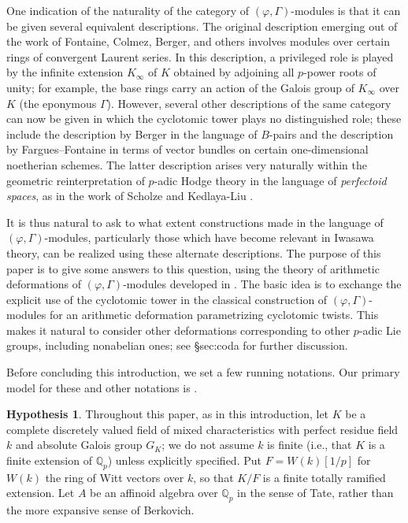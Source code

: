 \documentclass[12pt]{amsart}
\theoremstyle{definition}
\newtheorem{hypothesis}[theorem]{Hypothesis}
\numberwithin{equation}{theorem}
\newcommand{\QQ}{\mathbb{Q}}
\begin{document}
One indication of the naturality of the category of $(\varphi, \Gamma)$-modules is that it can be given several equivalent descriptions. The original description emerging out of the work of Fontaine, Colmez, Berger, and others involves modules over certain rings of convergent Laurent series. In this description, a privileged role is played by the infinite extension $K_\infty$ of $K$ obtained by adjoining all $p$-power roots of unity; for example, the base rings carry an action of the Galois group of $K_\infty$ over $K$ (the eponymous $\Gamma$). However, several other descriptions of the same category can now be given in which the cyclotomic tower plays no distinguished role; these include the description by Berger in the language of $B$-pairs and the description by Fargues--Fontaine in terms of vector bundles on certain one-dimensional noetherian schemes. The latter description arises very naturally within the geometric reinterpretation of $p$-adic Hodge theory in the language of \emph{perfectoid spaces}, as in the work of Scholze \cite{scholze1, scholze2, scholze-icm} and Kedlaya-Liu \cite{kedlaya-liu1, kedlaya-liu2}.

It is thus natural to ask to what extent constructions made in the language of $(\varphi, \Gamma)$-modules, particularly those which have become relevant in Iwasawa theory, can be realized using these alternate descriptions. The purpose of this paper is to give some answers to this question, using the theory of arithmetic deformations of $(\varphi, \Gamma)$-modules developed in \cite{kpx}. The basic idea is to exchange the explicit use of the cyclotomic tower in the classical construction of $(\varphi, \Gamma)$-modules for an arithmetic deformation parametrizing cyclotomic twists. This makes it natural to consider other deformations corresponding to other $p$-adic Lie groups, including nonabelian ones; see \S{sec:coda} for further discussion.

Before concluding this introduction, we set a few running notations. Our primary model for these and other notations is \cite{kpx}.
\setcounter{theorem}{0}
\begin{hypothesis}
Throughout this paper, as in this introduction, let $K$ be a complete discretely valued field of mixed characteristics with perfect residue field $k$ and absolute Galois group $G_K$; we do not assume $k$ is finite (i.e., that $K$ is a finite extension of $\QQ_p$) unless explicitly specified.
Put $F = W(k)[1/p]$ for $W(k)$ the ring of Witt vectors over $k$, so that $K/F$ is a finite totally ramified extension.
Let $A$ be an affinoid algebra over $\QQ_p$ in the sense of Tate, rather than the more expansive sense of Berkovich. 
\end{hypothesis}
\end{document}
